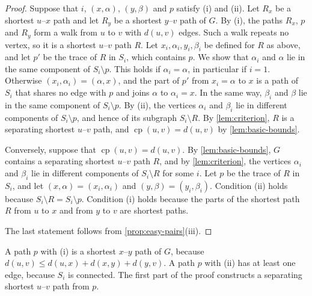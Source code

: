 \documentclass[pdflatex,sn-mathphys-num]{sn-jnl}%
\theoremstyle{thmstyleone}%
\theoremstyle{thmstyletwo}%
\theoremstyle{thmstylethree}%
\newcommand{\cp}{\operatorname{cp}}%
\begin{document}
\begin{proof}
Suppose that $i$, $(x, \alpha)$, $(y, \beta)$ and $p$ satisfy (i) and (ii).
Let $R_x$ be a shortest $u$--$x$ path and let $R_y$ be a shortest $y$--$v$ path of $G$.
By (i), the paths $R_x$, $p$ and $R_y$ form a walk from $u$ to $v$ with $d(u, v)$ edges.
Such a walk repeats no vertex, so it is a shortest $u$--$v$ path $R$.
Let $x_i, \alpha_i, y_i, \beta_i$ be defined for $R$ as above, and let $p'$ be the trace of $R$ in $S_i$, which contains $p$.
We show that $\alpha_i$ and $\alpha$ lie in the same component of $S_i \setminus p$.
This holds if $\alpha_i = \alpha$, in particular if $i = 1$.
Otherwise $(x_i, \alpha_i) = (\alpha, x)$, and the part of $p'$ from $x_i = \alpha$ to $x$ is a path of $S_i$ that shares no edge with $p$ and joins $\alpha$ to $\alpha_i = x$.
In the same way, $\beta_i$ and $\beta$ lie in the same component of $S_i \setminus p$.
By (ii), the vertices $\alpha_i$ and $\beta_i$ lie in different components of $S_i \setminus p$, and hence of its subgraph $S_i \setminus R$.
By \cref{lem:criterion}, $R$ is a separating shortest $u$--$v$ path, and $\cp(u, v) = d(u, v)$ by \cref{lem:basic-bounds}.

Conversely, suppose that $\cp(u, v) = d(u, v)$.
By \cref{lem:basic-bounds}, $G$ contains a separating shortest $u$--$v$ path $R$, and by \cref{lem:criterion}, the vertices $\alpha_i$ and $\beta_i$ lie in different components of $S_i \setminus R$ for some $i$.
Let $p$ be the trace of $R$ in $S_i$, and let $(x, \alpha) = (x_i, \alpha_i)$ and $(y, \beta) = (y_i, \beta_i)$.
Condition (ii) holds because $S_i \setminus R = S_i \setminus p$.
Condition (i) holds because the parts of the shortest path $R$ from $u$ to $x$ and from $y$ to $v$ are shortest paths.

The last statement follows from \cref{prop:easy-pairs}(iii).
\end{proof}

A path $p$ with (i) is a shortest $x$--$y$ path of $G$, because $d(u, v) \leq d(u, x) + d(x, y) + d(y, v)$.
A path $p$ with (ii) has at least one edge, because $S_i$ is connected.
The first part of the proof constructs a separating shortest $u$--$v$ path from $p$.
\end{document}
